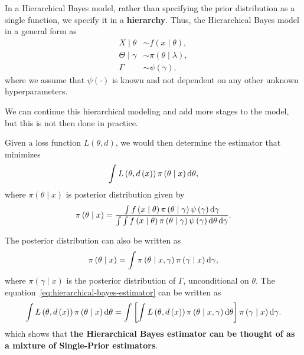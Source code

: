 In a Hierarchical Bayes model, rather than specifying the prior distribution as a single function, we specify it in a \textbf{hierarchy}. Thus, the Hierarchical Bayes model in a general form as
\begin{equation}
	\begin{aligned}
		X\mid\theta      & \sim f\left(x\mid\theta\right),         \\
		\Theta\mid\gamma & \sim \pi\left(\theta\mid\lambda\right), \\
		\Gamma           & \sim \psi\left(\gamma\right),
	\end{aligned}
	\label{eq:hierarchical-bayes}
\end{equation}
where we assume that \(\psi\left(\cdot\right)\) is known and not dependent on any other unknown hyperparameters.

\begin{remark}
	We can continue this hierarchical modeling and add more stages to the model, but this is not then done in practice.
\end{remark}

Given a loss function \(L\left(\theta,d\right)\), we would then determine the estimator that minimizes
\begin{equation} \label{eq:hierarchical-bayes-estimator}
	\int L\left(\theta,d\left(x\right)\right)\pi\left(\theta\mid x\right)\mathop{}\!\mathrm{d}\theta,
\end{equation}
where \(\pi\left(\theta\mid x\right)\) is posterior distribution given by
\begin{equation*}
	\pi\left(\theta\mid x\right)=\frac{\int f\left(x\mid\theta\right)\pi\left(\theta\mid\gamma\right)\psi\left(\gamma\right)\mathop{}\!\mathrm{d}\gamma}{\int\int f\left(x\mid\theta\right)\pi\left(\theta\mid\gamma\right)\psi\left(\gamma\right)\mathop{}\!\mathrm{d}\theta\mathop{}\!\mathrm{d}\gamma}.
\end{equation*}

\begin{remark}
	The posterior distribution can also be written as
	\begin{equation*}
		\pi\left(\theta\mid x\right)=\int\pi\left(\theta\mid x,\gamma\right)\pi\left(\gamma\mid x\right)\mathop{}\!\mathrm{d}\gamma,
	\end{equation*}
	where \(\pi\left(\gamma\mid x\right)\) is the posterior distribution of \(\Gamma\), unconditional on \(\theta\). The equation~\ref{eq:hierarchical-bayes-estimator} can be written as
	\begin{equation*}
		\int L\left(\theta,d\left(x\right)\right)\pi\left(\theta\mid x\right)\mathop{}\!\mathrm{d}\theta = \int\left[\int L\left(\theta,d\left(x\right)\right)\pi\left(\theta\mid x,\gamma\right)\mathop{}\!\mathrm{d}\theta\right]\pi\left(\gamma\mid x\right)\mathop{}\!\mathrm{d}\gamma.
	\end{equation*}
	which shows that \textbf{the Hierarchical Bayes estimator can be thought of as a mixture of Single-Prior estimators}.
\end{remark}

